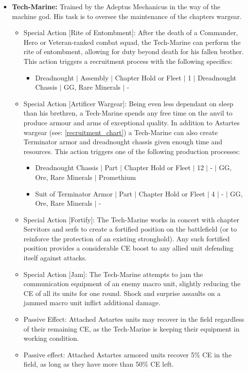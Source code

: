 \begin{itemize}
    \item \textbf{Tech-Marine:} Trained by the Adeptus Mechanicus in the way of the machine god. His task is to oversee the maintenance of the chapters wargear.
    \begin{itemize}
        \item Special Action [Rite of Entombment]: After the death of a Commander, Hero or Veteran-ranked combat squad, the Tech-Marine can perform the rite of entombment, allowing for duty beyond death for his fallen brother. This action triggers a recruitment process with the following specifics: 
        \begin{itemize}
            \item Dreadnought $|$ Assembly $|$ Chapter Hold or Fleet $|$ 1 $|$ Dreadnought Chassis $|$ GG, Rare Minerals $|$ -
        \end{itemize}
        \item Special Action [Artificer Wargear]: Being even less dependant on sleep than his brethren, a Tech-Marine spends any free time on the anvil to produce armour and arms of exceptional quality. In addition to Astartes wargear (see: \ref{recruitment_chart}) a Tech-Marine can also create Terminator armor and dreadnought chassis given enough time and resources. This action triggers one of the following production processes:
        \begin{itemize}
            \item Dreadnought Chassis $|$ Part $|$ Chapter Hold or Fleet $|$ 12 $|$ - $|$ GG, Ore, Rare Minerals $|$ Promethium
            \item Suit of Terminator Armor $|$ Part $|$ Chapter Hold or Fleet $|$ 4 $|$ - $|$ GG, Ore, Rare Minerals $|$ -
        \end{itemize}
        \item Special Action [Fortify]: The Tech-Marine works in concert with chapter Servitors and serfs to create a fortified position on the battlefield (or to reinforce the protection of an existing stronghold). Any such fortified position provides a considerable CE boost to any allied unit defending itself against attacks.
        \item Special Action [Jam]: The Tech-Marine attempts to jam the communication equipment of an enemy macro unit, slightly reducing the CE of all its units for one round. Shock and surprise assaults on a jammed macro unit inflict additional damage.
        \item Passive Effect: Attached Astartes units may recover in the field regardless of their remaining CE, as the Tech-Marine is keeping their equipment in working condition.
        \item Passive effect: Attached Astartes armored units recover 5\% CE in the field, as long as they have more than 50\% CE left.
    \end{itemize}
\end{itemize}

